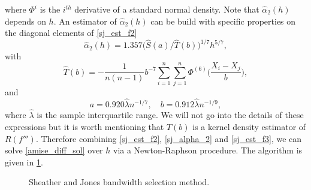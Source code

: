 where $\Phi^{i}$ is the $i^{th}$ derivative of a standard normal density. Note that $\hat\alpha_2(h)$ depends on $h$. An estimator of $\hat\alpha_2(h)$ can be build with specific properties on the diagonal elements of \cref{sj_est_f2}
\begin{equation}
\label{sj_alpha_2}
    \hat\alpha_2(h) = 1.357\big(\hat S(a)/\hat T(b)\big)^{1/7}h^{5/7},
\end{equation}
with
\begin{equation}
\label{sj_est_f3}
    \hat T(b) = -\frac{1}{n(n-1)}b^{-7}\sum_{i=1}^n\sum_{j=1}^n\Phi^{(6)}\Big(\frac{X_i-X_j}{b}\Big),
\end{equation}
and 
\begin{equation}
    a = 0.920\hat\lambda n^{-1/7}, \quad b= 0.912\hat\lambda n^{-1/9},
\end{equation}
where $\hat\lambda$ is the sample interquartile range. We will not go into the details of these expressions but it is worth mentioning that $\hat T(b)$ is a kernel density estimator of $R(f''')$. Therefore combining \cref{sj_est_f2}, \cref{sj_alpha_2} and \cref{sj_est_f3}, we can solve \cref{amise_diff_sol} over $h$ via a Newton-Raphson procedure. The algorithm is given in \cref{algo:sj_method}.

\begin{figure}[H]
\begin{center}
   \caption{Sheather and Jones bandwidth selection method.}
   \label{algo:sj_method}
\end{center}
\end{figure}
